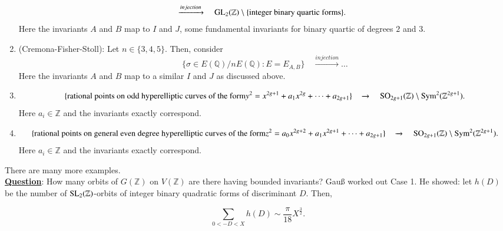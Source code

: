 \begin{examples}
\begin{enumerate}
\begin{align*}
&\xrightarrow{injection} \quad \operatorname{GL}_{2}(\mathbb{Z}) \setminus \{\text{integer binary quartic forms}\}.
\end{align*}
Here the invariants $A$ and $B$ map to $I$ and $J$, some fundamental invariants for binary quartic of degrees $2$ and $3$.
\item (Cremona-Fisher-Stoll):  Let $n \in \{3,4,5\}$.  Then, consider
\begin{equation*}
\{\sigma \in E(\mathbb{Q})/nE(\mathbb{Q}): E=E_{A,B}\} \quad \xrightarrow{injection} \dots
\end{equation*}
Here the invariants $A$ and $B$ map to a similar $I$ and $J$ as discussed above.
\item
\begin{equation*}
\{\text{rational points on odd hyperelliptic curves of the form} y^{2}=x^{2g+1}+a_{1}x^{2g}+\dots+a_{2g+1}\} \quad \xrightarrow{}\quad {\operatorname{SO}}_{2g+1}(\mathbb{Z})\setminus {\operatorname{Sym}}^{2}(\mathbb{Z}^{2g+1}).
\end{equation*}
Here $a_{i} \in \mathbb{Z}$ and the invariants exactly correspond.
\item
\begin{equation*}
\{\text{rational points on general even degree hyperelliptic curves of the form} z^{2}=a_{0}x^{2g+2}+a_{1}x^{2g+1}+\dots+a_{2g+1}\} \quad \xrightarrow{} \quad {\operatorname{SO}}_{2g+1}(\mathbb{Z})\setminus {\operatorname{Sym}}^{2}(\mathbb{Z}^{2g+1}).
\end{equation*}
Here $a_{i} \in \mathbb{Z}$ and the invariants exactly correspond.
\end{enumerate}
\end{examples}
There are many more examples.\\
\indent \underline{\textbf{Question}}:  How many orbits of $G(\mathbb{Z})$ on $V(\mathbb{Z})$ are there having bounded invariants?  Gau\ss{} worked out Case 1.  He showed:  let $h(D)$ be the number of ${\operatorname{SL}}_{2}(\mathbb{Z})$-orbits of integer binary quadratic forms of discriminant $D$.  Then,
\begin{theorem}
\begin{equation*}
\sum_{0 < -D < X} h(D) \sim \frac{\pi}{18}X^{\frac{3}{2}}.
\end{equation*}
\end{theorem}
